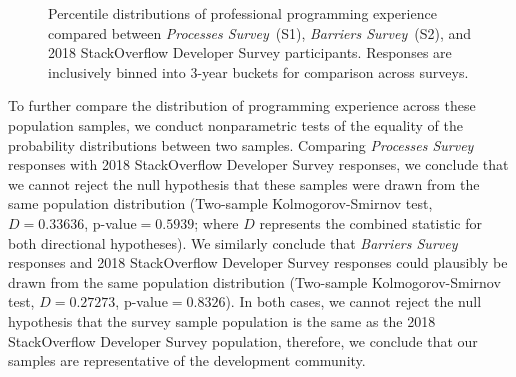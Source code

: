 \begin{figure}[!htbp]
\centering
{}
\caption{Percentile distributions of professional programming experience compared between \textit{Processes Survey}~(S1), \textit{Barriers Survey}~(S2), and 2018 StackOverflow Developer Survey participants. Responses are inclusively binned into 3-year buckets for comparison across surveys.\vspace*{-0.3\baselineskip}}
\label{populations}
\end{figure}

To further compare the distribution of programming experience across these population samples, we conduct nonparametric tests of the equality of the probability distributions between two samples.
Comparing \textit{Processes Survey} responses with 2018 StackOverflow Developer Survey responses, we conclude that we cannot reject the null hypothesis that these samples were drawn from the same population distribution (Two-sample Kolmogorov-Smirnov test, $D = 0.33636$, p-value$ = 0.5939$; where $D$ represents the combined statistic for both directional hypotheses).
We similarly conclude that \textit{Barriers Survey} responses and 2018 StackOverflow Developer Survey responses could plausibly be drawn from the same population distribution (Two-sample Kolmogorov-Smirnov test, $D = 0.27273$, p-value$ = 0.8326$).
In both cases, we cannot reject the null hypothesis that the survey sample population is the same as the 2018 StackOverflow Developer Survey population, therefore, we conclude that our samples are representative of the development community.

